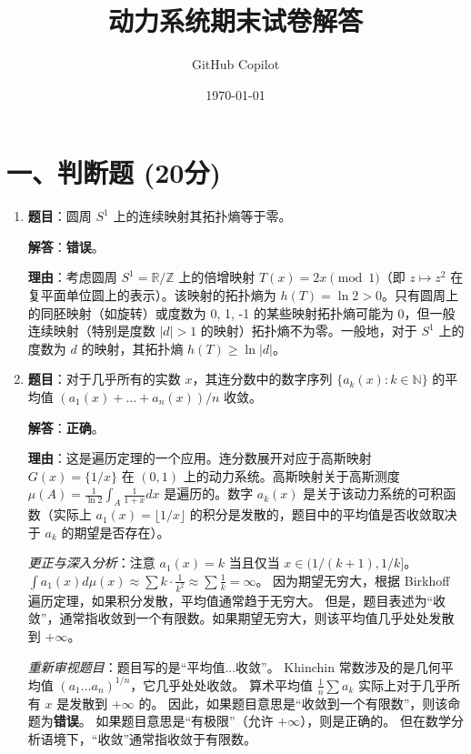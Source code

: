 \documentclass[a4paper,12pt]{article}
\title{动力系统期末试卷解答}
\author{GitHub Copilot}
\date{\today}
\begin{document}
\maketitle

\section*{一、判断题 (20分)}

\begin{enumerate}
    \item \textbf{题目}：圆周 $S^1$ 上的连续映射其拓扑熵等于零。
    
    \textbf{解答}：\textbf{错误}。
    
    \textbf{理由}：考虑圆周 $S^1 = \mathbb{R}/\mathbb{Z}$ 上的倍增映射 $T(x) = 2x \pmod 1$（即 $z \mapsto z^2$ 在复平面单位圆上的表示）。该映射的拓扑熵为 $h(T) = \ln 2 > 0$。只有圆周上的同胚映射（如旋转）或度数为 0, 1, -1 的某些映射拓扑熵可能为 0，但一般连续映射（特别是度数 $|d| > 1$ 的映射）拓扑熵不为零。一般地，对于 $S^1$ 上的度数为 $d$ 的映射，其拓扑熵 $h(T) \ge \ln |d|$。

    \item \textbf{题目}：对于几乎所有的实数 $x$，其连分数中的数字序列 $\{a_k(x): k \in \mathbb{N}\}$ 的平均值 $(a_1(x) + \dots + a_n(x))/n$ 收敛。
    
    \textbf{解答}：\textbf{正确}。
    
    \textbf{理由}：这是遍历定理的一个应用。连分数展开对应于高斯映射 $G(x) = \{1/x\}$ 在 $(0,1)$ 上的动力系统。高斯映射关于高斯测度 $\mu(A) = \frac{1}{\ln 2} \int_A \frac{1}{1+x} dx$ 是遍历的。数字 $a_k(x)$ 是关于该动力系统的可积函数（实际上 $a_1(x) = \lfloor 1/x \rfloor$ 的积分是发散的，题目中的平均值是否收敛取决于 $a_k$ 的期望是否存在）。
    
    \textit{更正与深入分析}：注意 $a_1(x) = k$ 当且仅当 $x \in (1/(k+1), 1/k]$。
    $\int a_1(x) d\mu(x) \approx \sum k \cdot \frac{1}{k^2} \approx \sum \frac{1}{k} = \infty$。
    因为期望无穷大，根据 Birkhoff 遍历定理，如果积分发散，平均值通常趋于无穷大。
    但是，题目表述为“收敛”，通常指收敛到一个有限数。如果期望无穷大，则该平均值几乎处处发散到 $+\infty$。
    
    \textit{重新审视题目}：题目写的是“平均值...收敛”。
    Khinchin 常数涉及的是几何平均值 $(a_1 \dots a_n)^{1/n}$，它几乎处处收敛。
    算术平均值 $\frac{1}{n} \sum a_k$ 实际上对于几乎所有 $x$ 是发散到 $+\infty$ 的。
    因此，如果题目意思是“收敛到一个有限数”，则该命题为\textbf{错误}。
    如果题目意思是“有极限”（允许 $+\infty$），则是正确的。
    但在数学分析语境下，“收敛”通常指收敛于有限数。
    

\end{enumerate}
\end{document}
